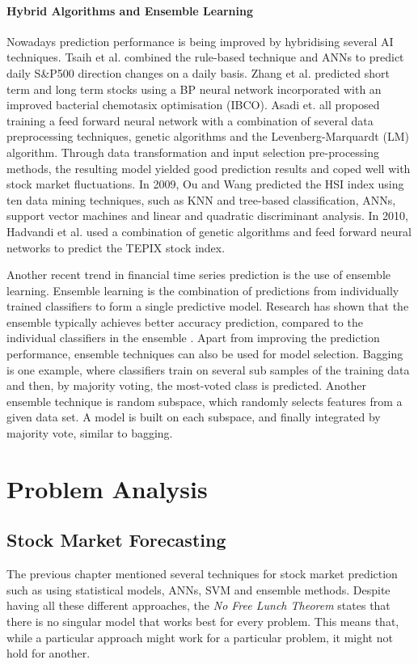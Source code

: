 \documentclass{UoYCSproject}
\begin{document}
\subsubsection{Hybrid Algorithms and Ensemble Learning}
Nowadays prediction performance is being improved by hybridising several AI techniques. Tsaih et al. \cite{tsaih1998forecasting} combined the rule-based technique and ANNs to predict daily S\&P500 direction changes on a daily basis. Zhang et al. \cite{zhang2009stock} predicted short term and long term stocks using a BP neural network incorporated with an improved bacterial chemotasix optimisation (IBCO). Asadi et. all \cite{asadi2012hybridization} proposed training a feed forward neural network with a combination of several data preprocessing techniques, genetic algorithms and the Levenberg-Marquardt (LM) algorithm. Through data transformation and input selection pre-processing methods, the resulting model yielded good prediction results and coped well with stock market fluctuations. In 2009, Ou and Wang \cite{ou2009prediction} predicted the HSI index using ten data mining techniques, such as KNN and tree-based classification, ANNs, support vector machines and linear and quadratic discriminant analysis. In 2010, Hadvandi et al. \cite{hadavandi2010developing} used a combination of genetic algorithms and feed forward neural networks to predict the TEPIX stock index.

Another recent trend in financial time series prediction is the use of ensemble learning. Ensemble learning is the combination of predictions from individually trained classifiers to form a single predictive model. Research has shown that the ensemble typically achieves better accuracy prediction, compared to the individual classifiers in the ensemble \cite{opitz1999popular}. Apart from improving the prediction performance, ensemble techniques can also be used for model selection. Bagging \cite{breiman1996bagging} is one example, where classifiers train on several sub samples of the training data and then, by majority voting, the most-voted class is predicted. Another ensemble technique is random subspace, which randomly selects features from a given data set. A model is built on each subspace, and finally integrated by majority vote, similar to bagging. 

\chapter{Problem Analysis}
\label{cha:problemanalysis}
\section{Stock Market Forecasting}
The previous chapter mentioned several techniques for stock market prediction such as using statistical models, ANNs, SVM and ensemble methods. Despite having all these different approaches, the \textit{No Free Lunch Theorem} \cite{wolpert1997no} states that there is no singular model that works best for every problem. This means that, while a particular approach might work for a particular problem, it might not hold for another. 
\end{document}
